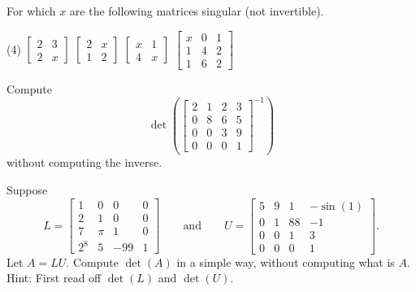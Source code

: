 \begin{exercise}
For which $x$ are the following matrices singular (not invertible).
\begin{tasks}(4)
\task
$\begin{bmatrix}
2 & 3 \\
2 & x
\end{bmatrix}$
\task
$\begin{bmatrix}
2 & x \\
1 & 2
\end{bmatrix}$
\task
$\begin{bmatrix}
x & 1 \\
4 & x
\end{bmatrix}$
\task
$\begin{bmatrix}
x & 0 & 1 \\
1 & 4 & 2 \\
1 & 6 & 2
\end{bmatrix}$
\end{tasks}
\end{exercise}

\begin{exercise}
Compute
\begin{equation*}
\det \left( \begin{bmatrix}
2 & 1 & 2 & 3 \\
0 & 8 & 6 & 5 \\
0 & 0 & 3 & 9 \\
0 & 0 & 0 & 1
\end{bmatrix}^{-1}
\right)
\end{equation*}
without computing the inverse.
\end{exercise}

\begin{exercise}
Suppose
\begin{equation*}
L = \begin{bmatrix}
1 & 0 & 0 & 0 \\
2 & 1 & 0 & 0 \\
7 & \pi & 1 & 0 \\
2^8 & 5 & -99 & 1
\end{bmatrix}
\qquad \text{and} \qquad
U = \begin{bmatrix}
5 & 9 & 1 & -\sin(1) \\
0 & 1 & 88 & -1 \\
0 & 0 & 1 & 3 \\
0 & 0 & 0 & 1
\end{bmatrix} .
\end{equation*}
Let $A = LU$.  Compute $\det(A)$ in a simple way, without computing what is $A$.
Hint: First read off $\det(L)$ and $\det(U)$.
\end{exercise}


